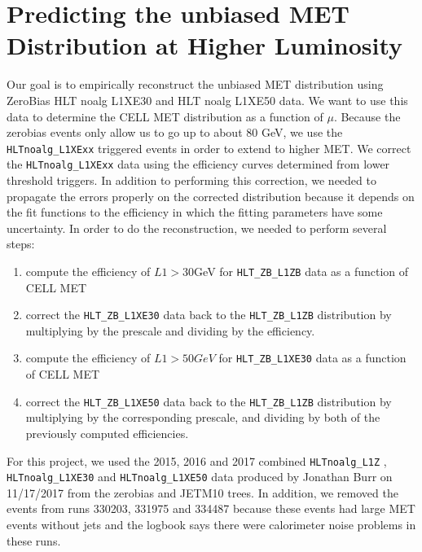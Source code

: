 \section{Predicting the unbiased MET Distribution at Higher Luminosity}
Our goal is to empirically reconstruct the unbiased MET distribution using ZeroBias HLT noalg L1XE30 and HLT noalg L1XE50 data. 
We want to use this data to determine the CELL MET distribution as a function of $\mu$.
Because the zerobias events only allow us to go up to about $80$ GeV, we use the \texttt{HLTnoalg\_L1XExx} triggered events in order to extend to higher MET.
We correct the \texttt{HLTnoalg\_L1XExx} data using the efficiency curves determined from lower threshold triggers.
In addition to performing this correction, we needed to propagate the errors properly on the corrected distribution because it depends on the fit functions to the efficiency in which the fitting parameters have some uncertainty. 
In order to do the reconstruction, we needed to perform several steps:
\begin{enumerate}
        \item compute the efficiency of $L1>30$GeV for \texttt{HLT\_ZB\_L1ZB} data as a function of CELL MET
        \item correct the \texttt{HLT\_ZB\_L1XE30} data back to the \texttt{HLT\_ZB\_L1ZB} distribution by multiplying by the prescale and dividing by the efficiency. 
        \item compute the efficiency of $L1>50GeV$ for \texttt{HLT\_ZB\_L1XE30} data as a function of CELL MET
        \item correct the \texttt{HLT\_ZB\_L1XE50} data back to the \texttt{HLT\_ZB\_L1ZB} distribution by multiplying by the corresponding prescale, and dividing by both of the previously computed efficiencies. 
\end{enumerate}
For this project, we used the 2015, 2016 and 2017 combined \texttt{HLTnoalg\_L1Z} , \texttt{HLTnoalg\_L1XE30} and \texttt{HLTnoalg\_L1XE50} data produced by Jonathan Burr on 11/17/2017 from the zerobias and JETM10 trees.
In addition, we removed the events from runs 330203, 331975 and 334487 because these events had large MET events without jets and the logbook says there were calorimeter noise problems in these runs. 
